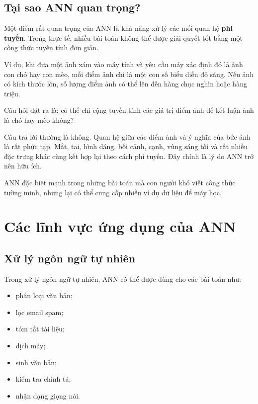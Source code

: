 \documentclass[12pt,a4paper]{report}
\begin{document}
\section{Tại sao ANN quan trọng?}

Một điểm rất quan trọng của ANN là khả năng xử lý các mối quan hệ \textbf{phi tuyến}. Trong thực tế, nhiều bài toán không thể được giải quyết tốt bằng một công thức tuyến tính đơn giản.

Ví dụ, khi đưa một ảnh xám vào máy tính và yêu cầu máy xác định đó là ảnh con chó hay con mèo, mỗi điểm ảnh chỉ là một con số biểu diễn độ sáng. Nếu ảnh có kích thước lớn, số lượng điểm ảnh có thể lên đến hàng chục nghìn hoặc hàng triệu.

Câu hỏi đặt ra là: có thể chỉ cộng tuyến tính các giá trị điểm ảnh để kết luận ảnh là chó hay mèo không?

Câu trả lời thường là không. Quan hệ giữa các điểm ảnh và ý nghĩa của bức ảnh là rất phức tạp. Mắt, tai, hình dáng, bối cảnh, cạnh, vùng sáng tối và rất nhiều đặc trưng khác cùng kết hợp lại theo cách phi tuyến. Đây chính là lý do ANN trở nên hữu ích.

\begin{ghinho}
ANN đặc biệt mạnh trong những bài toán mà con người khó viết công thức tường minh, nhưng lại có thể cung cấp nhiều ví dụ dữ liệu để máy học.
\end{ghinho}

\chapter{Các lĩnh vực ứng dụng của ANN}

\section{Xử lý ngôn ngữ tự nhiên}

Trong xử lý ngôn ngữ tự nhiên, ANN có thể được dùng cho các bài toán như:

\begin{itemize}
    \item phân loại văn bản;
    \item lọc email spam;
    \item tóm tắt tài liệu;
    \item dịch máy;
    \item sinh văn bản;
    \item kiểm tra chính tả;
    \item nhận dạng giọng nói.
\end{itemize}
\end{document}
